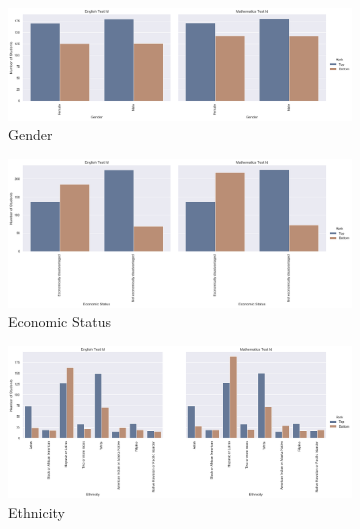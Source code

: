 \documentclass[11pt]{article}
\begin{document}
\begin{figure}[h!]
\centering
\begin{subfigure}{0.49\textwidth}
         \centering
         \includegraphics[width=\textwidth]{output_53_0.png}
         \caption{Gender}
         \label{fig:num_best_worst_counties_gender}
\end{subfigure}
\hfill
\begin{subfigure}{0.49\textwidth}
         \centering
         \includegraphics[width=\textwidth]{output_59_0.png}
         \caption{Economic Status}
         \label{fig:num_best_worst_counties_economic}
\end{subfigure}
\hfill
\begin{subfigure}{0.5\textwidth}
         \centering
         \includegraphics[width=\textwidth]{output_55_0.png}
         \caption{Ethnicity}
         \label{fig:num_best_worst_counties_ethnicity}
\end{subfigure}
\hfill
\begin{subfigure}{0.5\textwidth}

\end{subfigure}
\end{figure}
\end{document}
